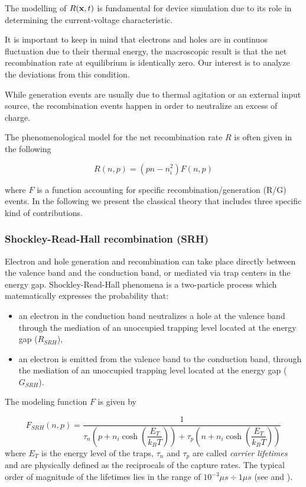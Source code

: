 The modelling of $R(\mathbf{x},t)$ is fundamental for device simulation due to its role in determining the current-voltage characteristic.
 
It is important to keep in mind that electrons and holes are in continuos fluctuation due to their thermal energy, the macroscopic result is that the net recombination rate at equilibrium  is identically zero. Our interest is to analyze the deviations from this condition. 

While generation events are usually due to thermal agitation or an external input source, the recombination events happen in order to neutralize an excess of charge.

The phenomenological model for the net recombination rate $R$ is often given in the following

\begin{equation}
\label{eq: generic RG}
R(n,p) = (pn-n_i^2)F(n,p)
\end{equation}

where $F$ is a function accounting for specific recombination/generation (R/G) events.
In the following we present the classical theory that includes three specific kind of contributions. 

\subsubsection{Shockley-Read-Hall recombination (SRH)}

Electron and hole generation and recombination can take place directly between the valence band and the conduction band, or mediated via trap centers in the energy gap. Shockley-Read-Hall phenomena is a two-particle process which matematically expresses the probability that:
\begin{itemize}
\item an electron in the conduction band neutralizes a hole at the valence band through the mediation of an unoccupied trapping level located at the energy gap ($R_{SRH}$),
\item an electron is emitted from the valence band to the conduction band, through the mediation of an unoccupied trapping level located at the energy gap ($G_{SRH}$).
\end{itemize}

The modeling function $F$ is given by

\begin{equation}
F_{SRH}(n,p) = \dfrac{1}{\tau_n\left(p+n_i \cosh\left(\dfrac{E_T}{k_BT} \right) \right)+\tau_p\left(n+n_i \cosh\left(\dfrac{E_T}{k_BT}\right) \right)}
\end{equation}
where $E_T$ is the energy level of the traps, $\tau_n$ and $\tau_p$ are called \textit{carrier lifetimes} and are physically defined as the reciprocals of the capture rates. The typical order of magnitude of the lifetimes lies in the range of $10^{-3}\mu s\div 1 \mu s$ (see  \cite{VanOver:SRH} and \cite{Goebel:SRH}). 

